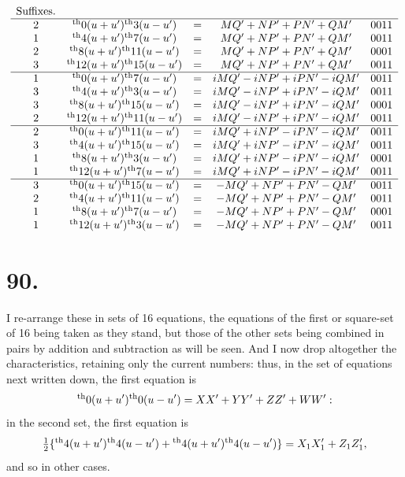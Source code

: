 \documentclass[11pt,a4paper]{book}
\providecommand{\uth}{\textsuperscript{th}}
\begin{document}
\[
\begin{array}{ccccc}
\text{Suffixes.} & & & & \\
\hline
2 & \uth{0}(u+u')\uth{3}(u-u') &=& MQ' + NP' + PN' + QM' & 0011 \\
1 & \uth{4}(u+u')\uth{7}(u-u') &=& MQ' + NP' + PN' + QM' & 0011 \\
2 & \uth{8}(u+u')\uth{11}(u-u') &=& MQ' + NP' + PN' + QM' & 0001 \\
3 & \uth{12}(u+u')\uth{15}(u-u') &=& MQ' + NP' + PN' + QM' & 0011 \\
\hline
1 & \uth{0}(u+u')\uth{7}(u-u') &=& iMQ' - iNP' + iPN' - iQM' & 0011 \\
3 & \uth{4}(u+u')\uth{3}(u-u') &=& iMQ' - iNP' + iPN' - iQM' & 0011 \\
3 & \uth{8}(u+u')\uth{15}(u-u') &=& iMQ' - iNP' + iPN' - iQM' & 0001 \\
2 & \uth{12}(u+u')\uth{11}(u-u') &=& iMQ' - iNP' + iPN' - iQM' & 0011 \\
\hline
2 & \uth{0}(u+u')\uth{11}(u-u') &=& iMQ' + iNP' - iPN' - iQM' & 0011 \\
3 & \uth{4}(u+u')\uth{15}(u-u') &=& iMQ' + iNP' - iPN' - iQM' & 0011 \\
1 & \uth{8}(u+u')\uth{3}(u-u') &=& iMQ' + iNP' - iPN' - iQM' & 0001 \\
1 & \uth{12}(u+u')\uth{7}(u-u') &=& iMQ' + iNP' - iPN' - iQM' & 0011 \\
\hline
3 & \uth{0}(u+u')\uth{15}(u-u') &=& -MQ' + NP' + PN' - QM' & 0011 \\
2 & \uth{4}(u+u')\uth{11}(u-u') &=& -MQ' + NP' + PN' - QM' & 0011 \\
1 & \uth{8}(u+u')\uth{7}(u-u') &=& -MQ' + NP' + PN' - QM' & 0001 \\
1 & \uth{12}(u+u')\uth{3}(u-u') &=& -MQ' + NP' + PN' - QM' & 0011
\end{array}
\]

\newpage
\section*{90.}
\label{sec:90}

I re-arrange these in sets of 16 equations, the equations of the first or square-set of 16 being taken as they stand, but those of the other sets being combined in pairs by addition and subtraction as will be seen. And I now drop altogether the characteristics, retaining only the current numbers: thus, in the set of equations next written down, the first equation is
\[
\uth{0}(u+u')\uth{0}(u-u') = XX' + YY' + ZZ' + WW':
\]
in the second set, the first equation is
\[
\tfrac{1}{2}\{\uth{4}(u+u')\uth{4}(u-u') + \uth{4}(u+u')\uth{4}(u-u')\} = X_1X_1' + Z_1Z_1',
\]
and so in other cases.
\end{document}
